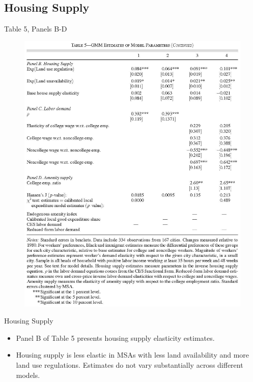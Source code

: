 \documentclass[aspectratio=169]{beamer}
\begin{document}

\subsection{Housing Supply}


\begin{frame}{Table 5, Panels B-D}

\begin{figure}
    \centering
    \includegraphics[scale=0.43]{DiamondTable5_2.jpg}
    \label{fig:Table5b}
\end{figure}
    
\end{frame}


\begin{frame}{Housing Supply}

\begin{itemize}
    \item<1-> Panel B of Table 5 presents housing supply elasticity estimates.
    \item<2-> Housing supply is less elastic in MSAs with less land availability and more land use regulations.  Estimates do not vary substantially across different models.
\end{itemize}
    
\end{frame}
\end{document}
